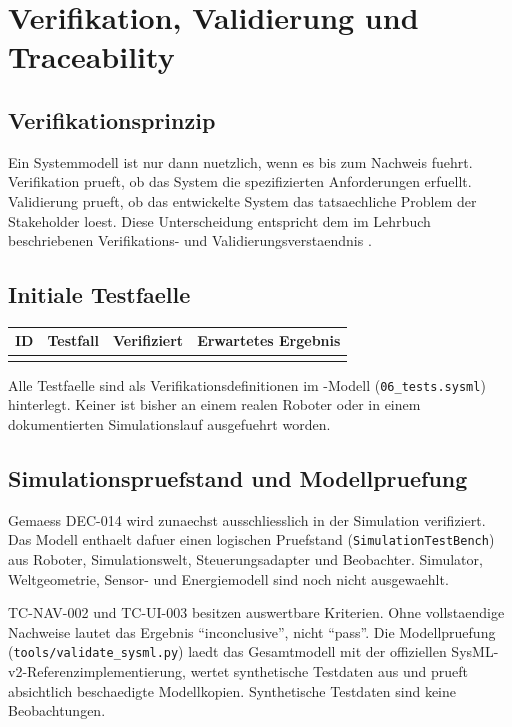 \chapter{Verifikation, Validierung und Traceability}

\section{Verifikationsprinzip}

Ein Systemmodell ist nur dann nuetzlich, wenn es bis zum Nachweis fuehrt. Verifikation prueft, ob das System die spezifizierten Anforderungen erfuellt. Validierung prueft, ob das entwickelte System das tatsaechliche Problem der Stakeholder loest. Diese Unterscheidung entspricht dem im Lehrbuch beschriebenen Verifikations- und Validierungsverstaendnis \cite[Kap.~19]{becker2026sysml}.

\section{Initiale Testfaelle}

\begin{longtable}{L{0.14\textwidth} L{0.24\textwidth} L{0.22\textwidth} L{0.24\textwidth}}
\toprule
ID & Testfall & Verifiziert & Erwartetes Ergebnis \\
\midrule
{}
\bottomrule
\end{longtable}

Alle Testfaelle sind als Verifikationsdefinitionen im \sysml-Modell (\texttt{06\_tests.sysml}) hinterlegt. Keiner ist bisher an einem realen Roboter oder in einem dokumentierten Simulationslauf ausgefuehrt worden.

\section{Simulationspruefstand und Modellpruefung}

Gemaess DEC-014 wird zunaechst ausschliesslich in der Simulation verifiziert. Das Modell enthaelt dafuer einen logischen Pruefstand (\texttt{SimulationTestBench}) aus Roboter, Simulationswelt, Steuerungsadapter und Beobachter. Simulator, Weltgeometrie, Sensor- und Energiemodell sind noch nicht ausgewaehlt.

TC-NAV-002 und TC-UI-003 besitzen auswertbare Kriterien. Ohne vollstaendige Nachweise lautet das Ergebnis \enquote{inconclusive}, nicht \enquote{pass}. Die Modellpruefung (\texttt{tools/validate\_sysml.py}) laedt das Gesamtmodell mit der offiziellen SysML-v2-Referenzimplementierung, wertet synthetische Testdaten aus und prueft absichtlich beschaedigte Modellkopien. Synthetische Testdaten sind keine Beobachtungen.

